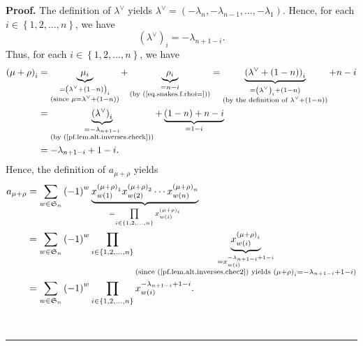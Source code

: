 \documentclass[numbers=enddot,12pt,final,onecolumn,notitlepage]{scrartcl}%
\theoremstyle{definition}
\newenvironment{proof}[1][Proof]{\noindent\textbf{#1.} }{\ \rule{0.5em}{0.5em}}
\let\sumnonlimits\sum
\let\prodnonlimits\prod
\renewcommand{\sum}{\sumnonlimits\limits}
\renewcommand{\prod}{\prodnonlimits\limits}
\begin{document}
\begin{proof}
The definition of $\lambda^{\vee}$ yields $\lambda^{\vee}=\left(  -\lambda
_{n},-\lambda_{n-1},\ldots,-\lambda_{1}\right)  $. Hence, for each
$i\in\left\{  1,2,\ldots,n\right\}  $, we have%
\begin{equation}
\left(  \lambda^{\vee}\right)  _{i}=-\lambda_{n+1-i}.
\label{pf.lem.alt.inverses.check}%
\end{equation}
Thus, for each $i\in\left\{  1,2,\ldots,n\right\}  $, we have%
\begin{align}
\left(  \mu+\rho\right)  _{i}  &  =\underbrace{\mu_{i}}_{\substack{=\left(
\lambda^{\vee}+\left(  1-n\right)  \right)  _{i}\\\text{(since }\mu
=\lambda^{\vee}+\left(  1-n\right)  \text{)}}}+\underbrace{\rho_{i}%
}_{\substack{=n-i\\\text{(by (\ref{eq.snakes.f.rhoi=}))}}}=\underbrace{\left(
\lambda^{\vee}+\left(  1-n\right)  \right)  _{i}}_{\substack{=\left(
\lambda^{\vee}\right)  _{i}+\left(  1-n\right)  \\\text{(by the definition of
}\lambda^{\vee}+\left(  1-n\right)  \text{)}}}+n-i\nonumber\\
&  =\underbrace{\left(  \lambda^{\vee}\right)  _{i}}_{\substack{=-\lambda
_{n+1-i}\\\text{(by (\ref{pf.lem.alt.inverses.check}))}}}+\underbrace{\left(
1-n\right)  +n-i}_{=1-i}\nonumber\\
&  =-\lambda_{n+1-i}+1-i. \label{pf.lem.alt.inverses.chec2}%
\end{align}
Hence, the definition of $a_{\mu+\rho}$ yields%
\begin{align}
a_{\mu+\rho}  &  =\sum_{w\in\mathfrak{S}_{n}}\left(  -1\right)  ^{w}%
\underbrace{x_{w\left(  1\right)  }^{\left(  \mu+\rho\right)  _{1}}x_{w\left(
2\right)  }^{\left(  \mu+\rho\right)  _{2}}\cdots x_{w\left(  n\right)
}^{\left(  \mu+\rho\right)  _{n}}}_{=\prod_{i\in\left\{  1,2,\ldots,n\right\}
}x_{w\left(  i\right)  }^{\left(  \mu+\rho\right)  _{i}}}\nonumber\\
&  =\sum_{w\in\mathfrak{S}_{n}}\left(  -1\right)  ^{w}\prod_{i\in\left\{
1,2,\ldots,n\right\}  }\underbrace{x_{w\left(  i\right)  }^{\left(  \mu
+\rho\right)  _{i}}}_{\substack{=x_{w\left(  i\right)  }^{-\lambda
_{n+1-i}+1-i}\\\text{(since (\ref{pf.lem.alt.inverses.chec2}) yields }\left(
\mu+\rho\right)  _{i}=-\lambda_{n+1-i}+1-i\text{)}}}\nonumber\\
&  =\sum_{w\in\mathfrak{S}_{n}}\left(  -1\right)  ^{w}\prod_{i\in\left\{
1,2,\ldots,n\right\}  }x_{w\left(  i\right)  }^{-\lambda_{n+1-i}+1-i}.
\label{pf.lem.alt.inverses.ampr}%
\end{align}



\end{proof}
\end{document}
